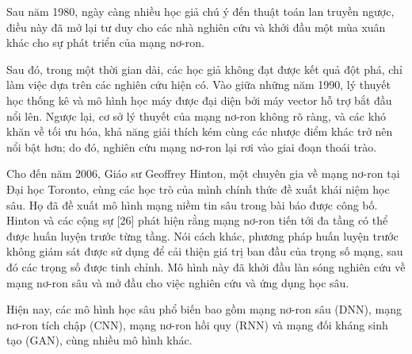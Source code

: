 \documentclass[a4paper]{article}
\begin{document}
Sau năm 1980, ngày càng nhiều học giả chú ý đến thuật toán lan truyền ngược, điều này đã mở lại tư duy cho các nhà nghiên cứu và khởi đầu một mùa xuân khác cho sự phát triển của mạng nơ-ron.

Sau đó, trong một thời gian dài, các học giả không đạt được kết quả đột phá, chỉ làm việc dựa trên các nghiên cứu hiện có. Vào giữa những năm 1990, lý thuyết học thống kê và mô hình học máy được đại diện bởi máy vector hỗ trợ bắt đầu nổi lên. Ngược lại, cơ sở lý thuyết của mạng nơ-ron không rõ ràng, và các khó khăn về tối ưu hóa, khả năng giải thích kém cùng các nhược điểm khác trở nên nổi bật hơn; do đó, nghiên cứu mạng nơ-ron lại rơi vào giai đoạn thoái trào.

Cho đến năm 2006, Giáo sư Geoffrey Hinton, một chuyên gia về mạng nơ-ron tại Đại học Toronto, cùng các học trò của mình chính thức đề xuất khái niệm học sâu. Họ đã đề xuất mô hình mạng niềm tin sâu trong bài báo được công bố. Hinton và các cộng sự [26] phát hiện rằng mạng nơ-ron tiến tới đa tầng có thể được huấn luyện trước từng tầng. Nói cách khác, phương pháp huấn luyện trước không giám sát được sử dụng để cải thiện giá trị ban đầu của trọng số mạng, sau đó các trọng số được tinh chỉnh. Mô hình này đã khởi đầu làn sóng nghiên cứu về mạng nơ-ron sâu và mở đầu cho việc nghiên cứu và ứng dụng học sâu.

Hiện nay, các mô hình học sâu phổ biến bao gồm mạng nơ-ron sâu (DNN), mạng nơ-ron tích chập (CNN), mạng nơ-ron hồi quy (RNN) và mạng đối kháng sinh tạo (GAN), cùng nhiều mô hình khác.
\end{document}
